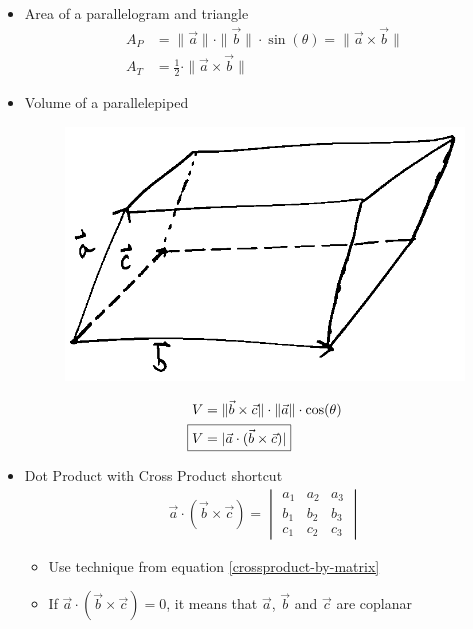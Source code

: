 \documentclass{article}
\begin{document}
\begin{itemize}
\begin{itemize}
  \end{itemize}
  \item Area of a parallelogram and triangle
  \begin{align}
    A_P &= \|\vec{a}\|\cdot\|\vec{b}\|\cdot\sin(\theta) = \|\vec{a}\times\vec{b}\| \\
    A_T &= \frac{1}{2}\cdot\|\vec{a}\times\vec{b}\|
  \end{align}
  \item Volume of a parallelepiped
  \begin{figure}[h]
    \includegraphics[scale=0.4]{parallelepiped}
    \centering
    \label{fig:parallelepiped}
  \end{figure}
  \begin{align}
    \begin{split}
      V &= \|\vec{b}\times\vec{c}\|\cdot\|\vec{a}\|\cdot\cos(\theta) \\
      \Aboxed{
        V &= |\vec{a}\cdot(\vec{b}\times\vec{c})|
      }
    \end{split}
  \end{align}
  \item Dot Product with Cross Product shortcut
  \begin{align}
    \vec{a}\cdot(\vec{b}\times\vec{c}) =
    \begin{vmatrix}
      a_1 & a_2 & a_3 \\
      b_1 & b_2 & b_3 \\
      c_1 & c_2 & c_3
    \end{vmatrix}
  \end{align}
  \begin{itemize}
    \item Use technique from equation \ref{crossproduct-by-matrix}
    \item If $\vec{a}\cdot(\vec{b}\times\vec{c}) = 0$, it means that $\vec{a}$, $\vec{b}$ and $\vec{c}$ are coplanar

\end{itemize}
\end{itemize}
\end{document}
